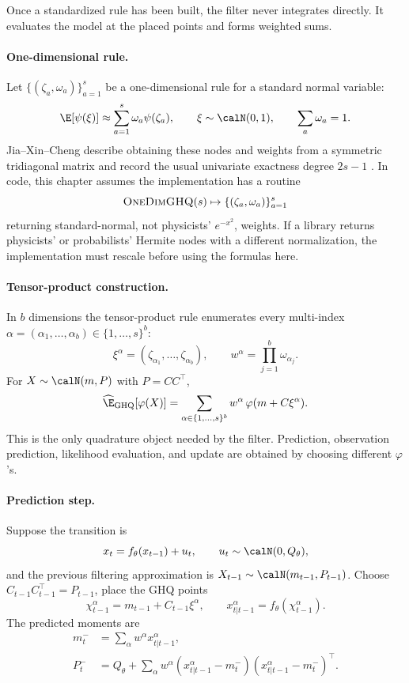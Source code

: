 Once a standardized rule has been built, the filter never integrates directly.
It evaluates the model at the placed points and forms weighted sums.

\paragraph{One-dimensional rule.}
Let \(\{(\zeta_a,\omega_a)\}_{a=1}^s\) be a one-dimensional rule for a standard
normal variable:
\[
  \E[\psi(\xi)]\approx \sum_{a=1}^s\omega_a\psi(\zeta_a),
  \qquad \xi\sim\calN(0,1),\qquad \sum_a\omega_a=1 .
\]
Jia--Xin--Cheng describe obtaining these nodes and weights from a symmetric
tridiagonal matrix and record the usual univariate exactness degree
\(2s-1\) \citep[Section 2.2.1]{jia2012sparsegrid}.  In code, this chapter
assumes the implementation has a routine
\[
  \textsc{OneDimGHQ}(s)\mapsto \{(\zeta_a,\omega_a)\}_{a=1}^s
\]
returning standard-normal, not physicists' \(e^{-x^2}\), weights.  If a library
returns physicists' or probabilists' Hermite nodes with a different
normalization, the implementation must rescale before using the formulas here.

\paragraph{Tensor-product construction.}
In \(b\) dimensions the tensor-product rule enumerates every multi-index
\(\alpha=(\alpha_1,\ldots,\alpha_b)\in\{1,\ldots,s\}^b\):
\begin{equation}
  \xi^\alpha=(\zeta_{\alpha_1},\ldots,\zeta_{\alpha_b}),\qquad
  w^\alpha=\prod_{j=1}^b\omega_{\alpha_j}.
  \label{eq:bf-hd-ghq-tensor-rule}
\end{equation}
For \(X\sim\calN(m,P)\) with \(P=CC^\top\),
\begin{equation}
  \widehat{\E}_{\rm GHQ}[\varphi(X)]
  =
  \sum_{\alpha\in\{1,\ldots,s\}^b}
  w^\alpha\,
  \varphi(m+C\xi^\alpha).
  \label{eq:bf-hd-ghq-expectation}
\end{equation}
This is the only quadrature object needed by the filter.  Prediction,
observation prediction, likelihood evaluation, and update are obtained by
choosing different \(\varphi\)'s.

\paragraph{Prediction step.}
Suppose the transition is
\[
  x_t=f_\theta(x_{t-1})+u_t,\qquad u_t\sim\calN(0,Q_\theta),
\]
and the previous filtering approximation is \(X_{t-1}\sim\calN(m_{t-1},P_{t-1})\).
Choose \(C_{t-1}C_{t-1}^\top=P_{t-1}\), place the GHQ points
\[
  \chi_{t-1}^{\alpha}=m_{t-1}+C_{t-1}\xi^\alpha,
  \qquad
  x_{t|t-1}^{\alpha}=f_\theta(\chi_{t-1}^{\alpha}).
\]
The predicted moments are
\begin{align}
  m_t^- &= \sum_\alpha w^\alpha x_{t|t-1}^{\alpha},\\
  P_t^- &= Q_\theta+
  \sum_\alpha w^\alpha
  (x_{t|t-1}^{\alpha}-m_t^-)
  (x_{t|t-1}^{\alpha}-m_t^-)^\top .
  \label{eq:bf-hd-ghq-predict}
\end{align}

